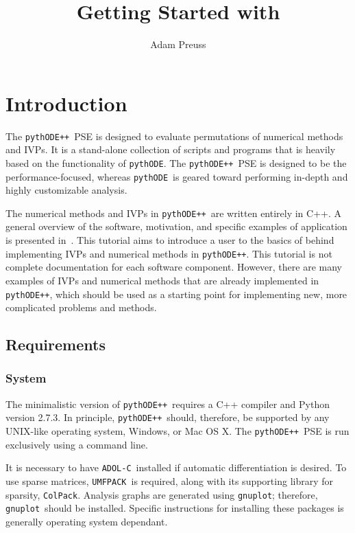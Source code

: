 \documentclass[11pt]{article}
\title{Getting Started with \pypp}
\author{Adam Preuss}
\newcommand{\pythode}{\texttt{pythODE}}
\newcommand{\pypp}{\texttt{pythODE++}}
\newcommand{\adolc}{\texttt{ADOL-C}}
\newcommand{\umfpack}{\texttt{UMFPACK}}
\newcommand{\colpack}{\texttt{ColPack}}
\newcommand{\gnuplot}{\texttt{gnuplot}}
\begin{document}
\maketitle

\section{Introduction}
\label{sec:intro}

The \pypp\ \ac{PSE} is designed to evaluate permutations of numerical methods and \acp{IVP}.
It is a stand-alone collection of scripts and programs that is heavily based on the functionality of \pythode.
The \pypp\ PSE is designed to be the performance-focused, whereas \pythode\ is geared toward performing in-depth and highly customizable analysis.

The numerical methods and \acp{IVP} in \pypp\ are written entirely in C++.
A general overview of the software, motivation, and specific examples of application is presented in~\cite{preuss14}.
This tutorial aims to introduce a user to the basics of behind implementing \acp{IVP} and numerical methods in \pypp.
This tutorial is not complete documentation for each software component.
However, there are many examples of \acp{IVP} and numerical methods that are already implemented in \pypp, which should be used 
as a starting point for implementing new, more complicated problems and methods.

\subsection{Requirements}

\subsubsection{System}

The minimalistic version of \pypp\ requires a C++ compiler and Python version 2.7.3. In principle, \pypp\ should, therefore, be supported by any UNIX-like operating system, Windows, or Mac OS X. The \pypp\ PSE is run exclusively using a command line.

It is necessary to have \adolc\ installed if automatic differentiation is desired. To use sparse matrices, \umfpack\ is required, along with its supporting library for sparsity, \colpack. Analysis graphs are generated using \gnuplot; therefore, \gnuplot\ should be installed. Specific instructions for installing these packages is generally operating system dependant.
\end{document}
